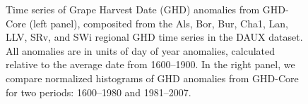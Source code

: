 \documentclass[final]{nature}
\begin{document}


\begin{figure}
\caption{Time series of Grape Harvest Date (GHD) anomalies from GHD-Core (left panel), composited from the Als, Bor, Bur, Cha1, Lan, LLV, SRv, and SWi regional GHD time series in the DAUX dataset. All anomalies are in units of day of year anomalies, calculated  relative to the average date from 1600--1900. In the right panel, we compare normalized histograms of GHD anomalies from GHD-Core for two periods: 1600--1980 and 1981--2007.}
\end{figure}
\end{document}
